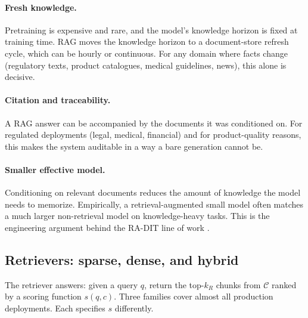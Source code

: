 \paragraph{Fresh knowledge.} Pretraining is expensive and rare, and
the model's knowledge horizon is fixed at training time. RAG moves
the knowledge horizon to a document-store refresh cycle, which can
be hourly or continuous. For any domain where facts change
(regulatory texts, product catalogues, medical guidelines, news),
this alone is decisive.

\paragraph{Citation and traceability.} A RAG answer can be
accompanied by the documents it was conditioned on. For regulated
deployments (legal, medical, financial) and for product-quality
reasons, this makes the system auditable in a way a bare
generation cannot be.

\paragraph{Smaller effective model.} Conditioning on relevant
documents reduces the amount of knowledge the model needs to
memorize. Empirically, a retrieval-augmented small model often
matches a much larger non-retrieval model on knowledge-heavy
tasks. This is the engineering argument behind the RA-DIT line of
work \citep{lin2024radit}.

\subsection{Retrievers: sparse, dense, and hybrid}
\label{sec:hybrid-retrieval}

The retriever answers: given a query $q$, return the top-$k_R$
chunks from $\mathcal{C}$ ranked by a scoring function
$s(q, c)$. Three families cover almost all production deployments.
Each specifies $s$ differently.

